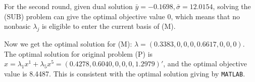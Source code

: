 For the second round, given dual solution  $\bar{y} = -0.1698, \bar{\sigma} = 12.0154$, solving the (SUB) problem can give the optimal objective value 0, which means that no nonbasic $\lambda_j$ is eligible to enter the current basis of (M).

Now we get the optimal solution for (M): $\lambda = (0.3383,0,0,0,0.6617,0,0,0)$. The optimal solution for original problem (P) is $\hat{x} = \lambda_1 x^1 + \lambda_5 x^5 = (0.4278,0.6040,0,0,0,1.2979)'$, and the optimal objective value is 8.4487. This is consistent with the optimal solution giving by {\tt MATLAB}.